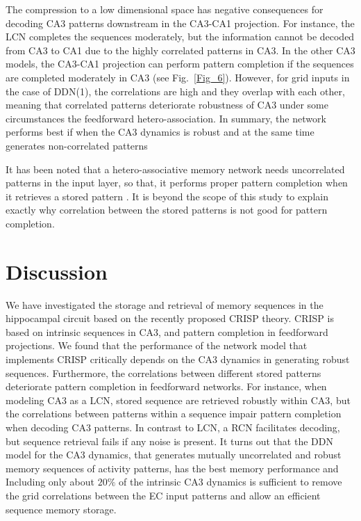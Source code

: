 \documentclass[utf8]{frontiersSCNS} %
\begin{document}
The compression to a low dimensional space has negative consequences for decoding CA3 patterns downstream in the CA3-CA1 projection. For instance, the LCN completes the sequences moderately, but the information cannot be decoded from CA3 to CA1 due to the highly correlated patterns in CA3. In the other CA3 models, the CA3-CA1 projection can perform pattern completion if the sequences are completed moderately in CA3 (see Fig.~\ref{Fig_6}). 
%
However, for grid inputs in the case of DDN(1), the correlations are high and they overlap with each other, meaning that correlated patterns deteriorate robustness of CA3 under some circumstances the feedforward hetero-association.
In summary, the network performs best if when the CA3 dynamics is robust and at the same time generates non-correlated patterns     
     
It has been noted that a hetero-associative memory network needs uncorrelated patterns in the input layer, so that, it performs proper pattern completion when it retrieves a stored pattern \citep{willshaw1969non, neher2015memory}. It is beyond the scope of this study to explain exactly why correlation between the stored patterns is not good for pattern completion. 


\section{Discussion}

We have investigated the storage and retrieval of memory sequences in the hippocampal circuit based on the recently proposed CRISP theory. CRISP is based on intrinsic sequences in CA3, and pattern completion in feedforward projections. We found that the performance of the network model that implements CRISP critically depends on the CA3 dynamics in generating robust sequences. Furthermore, the correlations between different stored patterns deteriorate pattern completion in feedforward networks. For instance, when modeling CA3 as a LCN, stored sequence are retrieved robustly within CA3, but the correlations between patterns within a sequence impair pattern completion when decoding CA3 patterns. In contrast to LCN, a RCN facilitates decoding, but sequence retrieval fails if any noise is present.
%
It turns out that the DDN model for the CA3 dynamics, that generates mutually uncorrelated and robust memory sequences of activity patterns, has the best memory performance and 
%
Including only about $20\%$ of the intrinsic CA3 dynamics is sufficient to remove the grid correlations between the EC input patterns and allow an efficient sequence memory storage.   
%
\end{document}
